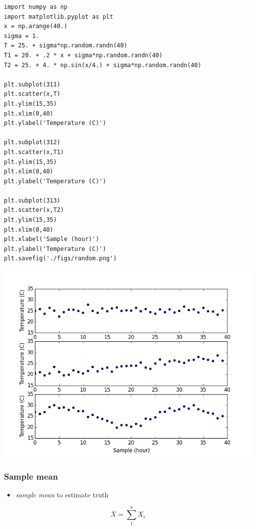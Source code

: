 \documentclass[11pt]{article}
\begin{document}
\begin{verbatim}
import numpy as np
import matplotlib.pyplot as plt
x = np.arange(40.)
sigma = 1.
T = 25. + sigma*np.random.randn(40)
T1 = 20. + .2 * x + sigma*np.random.randn(40)
T2 = 25. + 4. * np.sin(x/4.) + sigma*np.random.randn(40)

plt.subplot(311)
plt.scatter(x,T)
plt.ylim(15,35)
plt.xlim(0,40)
plt.ylabel('Temperature (C)')

plt.subplot(312)
plt.scatter(x,T1)
plt.ylim(15,35)
plt.xlim(0,40)
plt.ylabel('Temperature (C)')

plt.subplot(313)
plt.scatter(x,T2)
plt.ylim(15,35)
plt.xlim(0,40)
plt.xlabel('Sample (hour)')
plt.ylabel('Temperature (C)')
plt.savefig('./figs/random.png')
\end{verbatim}

\includegraphics[width=.9\linewidth]{./figs/random.png}

\subsubsection{Sample mean}
\label{sec-3-7-4}
\begin{itemize}
\item \emph{sample mean} to estimate truth
\end{itemize}
\[\boxed{\bar{X}=\sum_{1}^{n}X_{i}} \]
\end{document}
